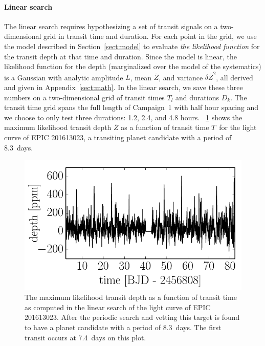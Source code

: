 \documentclass[12pt,preprint]{aastex}
\newcommand{\figref}[1]{\ref{fig:#1}}
\newcommand{\Fig}[1]{\figurename~\figref{#1}}
\newcommand{\figlabel}[1]{\label{fig:#1}}
\newcommand{\sectionname}{Section}
\newcommand{\Sect}[1]{\sectionname~\ref{sect:#1}}
\newcommand{\sect}[1]{\Sect{#1}}
\newcommand{\App}[1]{Appendix~\ref{sect:#1}}
\newcommand{\app}[1]{\App{#1}}
\newcommand{\duration}{{\ensuremath{D}}}
\newcommand{\depth}{{\ensuremath{Z}}}
\newcommand{\transittime}{{\ensuremath{T}}}
\begin{document}
\paragraph{Linear search}

The linear search requires hypothesizing a set of transit signals on a
two-dimensional grid in transit time and duration.
For each point in the grid, we use the model described in \sect{model} to
evaluate \emph{the likelihood function} for the transit depth at that time
and duration.
Since the model is linear, the likelihood function for the depth (marginalized
over the model of the systematics) is a Gaussian with analytic amplitude $L$,
mean $\bar{\depth}$, and variance $\delta\bar{\depth}^2$, all derived and given in
\app{math}.
In the linear search, we save these three numbers on a
two-dimensional grid of transit times $\transittime_l$ and durations
$\duration_k$.
The transit time grid spans the full length of Campaign~1 with half hour spacing
and we choose to only test three durations: 1.2, 2.4, and 4.8 hours.
\Fig{linear} shows the maximum likelihood transit depth $\bar{\depth}$ as a
function of transit time \transittime\ for the light curve of EPIC 201613023,
a transiting planet candidate with a period of 8.3~days.

\begin{figure}[p]
\begin{center}
\includegraphics{figures/linear.pdf}
\end{center}
\caption{%
The maximum likelihood transit depth as a function of transit time as computed
in the linear search of the light curve of EPIC 201613023.
After the periodic search and vetting this target is found to have a planet
candidate with a period of 8.3~days.
The first transit occurs at 7.4~days on this plot.
\figlabel{linear}}
\end{figure}
\end{document}

